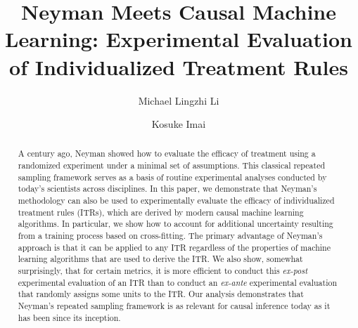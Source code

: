 \documentclass[USenglish,onecolumn]{article}
\begin{document}

  \author*[1]{Michael Lingzhi Li}

\author[2]{Kosuke Imai}



  \title{\huge Neyman Meets Causal Machine Learning: Experimental
    Evaluation of Individualized Treatment Rules}



  \begin{abstract}
    {A century ago, Neyman showed how to evaluate the efficacy of
      treatment using a randomized experiment under a minimal set of
      assumptions.  This classical repeated sampling framework serves
      as a basis of routine experimental analyses conducted by today's
      scientists across disciplines.  In this paper, we demonstrate
      that Neyman's methodology can also be used to experimentally
      evaluate the efficacy of individualized treatment rules (ITRs),
      which are derived by modern causal machine learning algorithms.
      In particular, we show how to account for additional uncertainty
      resulting from a training process based on cross-fitting.  The
      primary advantage of Neyman's approach is that it can be applied
      to any ITR regardless of the properties of machine learning
      algorithms that are used to derive the ITR. We also show,
      somewhat surprisingly, that for certain metrics, it is more
      efficient to conduct this \emph{ex-post} experimental evaluation
      of an ITR than to conduct an \emph{ex-ante} experimental
      evaluation that randomly assigns some units to the ITR.  Our
      analysis demonstrates that Neyman's repeated sampling framework
      is as relevant for causal inference today as it has been since
      its inception.}
\end{abstract}


 
\end{document}
